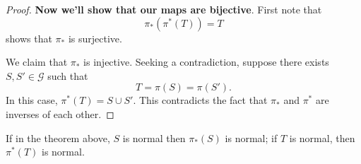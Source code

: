 \documentclass{ximera}
\begin{document}
\begin{theorem}
\begin{proof}
    \textbf{Now we'll show that our maps are bijective}. First note
    that
    \[
    \pi_*(\pi^*(T)) = T
    \]
    shows that $\pi_*$ is surjective.

    We claim that $\pi_*$ is injective. Seeking a contradiction,
    suppose there exists $S,S'\in \mathcal{G}$ such that
    \[
    T = \pi(S) =\pi(S').
    \]
    In this case, $\pi^*(T) = S\cup S'$. This contradicts the
    fact that $\pi_*$ and $\pi^*$ are inverses of each other.
  \end{proof}
\end{theorem}


\begin{corollary}
  If in the theorem above, $S$ is normal then $\pi_*(S)$ is normal; if
  $T$ is normal, then $\pi^*(T)$ is normal.
\end{corollary}
\end{document}
